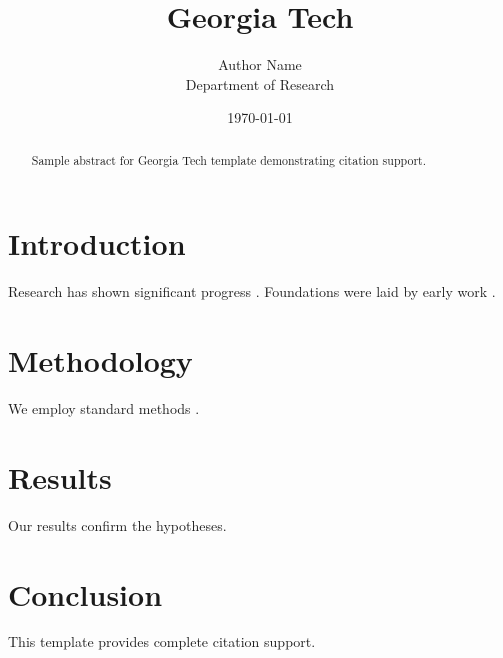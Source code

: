 \documentclass{thesis_georgia}
\title{Georgia Tech}
\author{Author Name \\ \small Department of Research}
\date{\today}
\begin{document}
\maketitle

\begin{abstract}
Sample abstract for Georgia Tech template demonstrating citation support.
\end{abstract}

\section{Introduction}
Research has shown significant progress \citep{einstein1905}. Foundations were laid by early work \citep{turing1950}.

\section{Methodology}
We employ standard methods \citep{knuth1984}.

\section{Results}
Our results confirm the hypotheses.

\section{Conclusion}
This template provides complete citation support.



\end{document}
